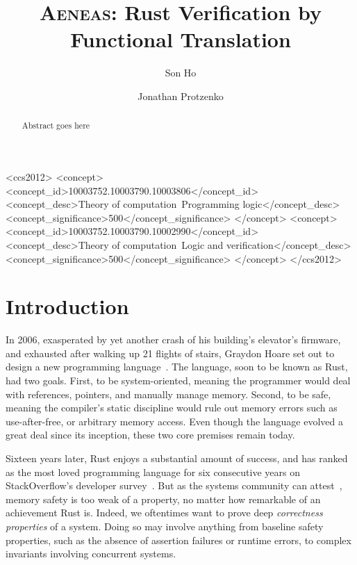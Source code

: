 \documentclass[acmsmall,screen]{acmart}
\newcommand{\aeneas}{\textsc{Aeneas}\xspace}
\begin{document}
\title{\aeneas: Rust Verification by Functional Translation}

\author{Son Ho}

\author{Jonathan Protzenko}


\begin{abstract}
  Abstract goes here
\end{abstract}


\begin{CCSXML}
<ccs2012>
<concept>
<concept_id>10003752.10003790.10003806</concept_id>
<concept_desc>Theory of computation~Programming logic</concept_desc>
<concept_significance>500</concept_significance>
</concept>
<concept>
<concept_id>10003752.10003790.10002990</concept_id>
<concept_desc>Theory of computation~Logic and verification</concept_desc>
<concept_significance>500</concept_significance>
</concept>
</ccs2012>
\end{CCSXML}




\maketitle

\section{Introduction}

In 2006, exasperated by yet another crash of his building's elevator's firmware, and
exhausted after walking up 21 flights of stairs, Graydon Hoare set out to design a
new programming language~\cite{rust-anecdote}. The language, soon to be
known as Rust, had two goals. First, to be system-oriented, meaning the
programmer would deal with references, pointers, and manually manage memory.
Second, to be safe, meaning the compiler's static discipline
would rule out memory errors such as use-after-free, or arbitrary memory access.
Even though the language evolved a great deal since its inception, these
two core premises remain today.

Sixteen years later, Rust enjoys a substantial amount of success, and has ranked as the most
loved programming language for six consecutive years on StackOverflow's
developer survey~\cite{stackoverflow}.
But as the systems community can
attest~\cite{klein2009sel4,lorch2020armada,ferraiuolo2017komodo,bhargavan2017everest},
memory safety is too weak of a property, no matter how remarkable of
an achievement Rust is.
Indeed, we oftentimes want to prove deep \emph{correctness properties}
of a system. Doing so may involve anything from baseline safety
properties, such as the absence
of assertion failures or runtime errors,
to complex invariants involving
concurrent systems.
\end{document}
